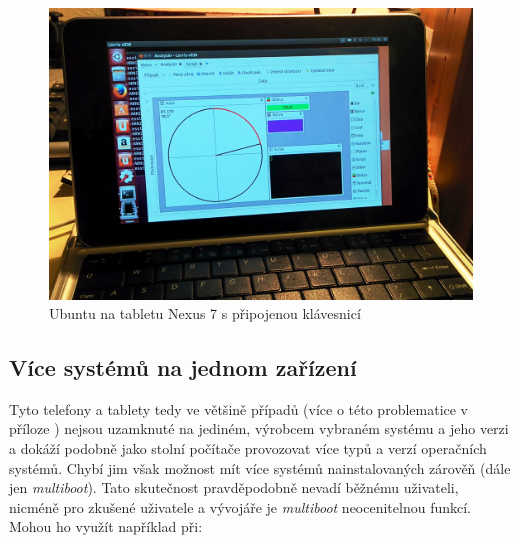 \documentclass[12pt, a4paper, oneside]{article}
\newcommand{\It}{\textit}  %
\begin{document}
\begin{figure}[H]
\begin{center}
\includegraphics[width=\textwidth]{img/n7_ubuntu.jpg}
\caption{Ubuntu na tabletu Nexus 7 s připojenou klávesnicí}
\end{center}
\end{figure}


\subsection{Více systémů na jednom zařízení}
Tyto telefony a tablety tedy ve většině případů (více o této problematice v příloze ) nejsou uzamknuté na jediném, výrobcem vybraném systému a jeho verzi a dokáží podobně jako stolní počítače provozovat více typů a verzí operačních systémů. Chybí jim však možnost mít více systémů nainstalovaných zárověň (dále jen \It{multiboot}). Tato skutečnost pravděpodobně nevadí běžnému uživateli, nicméně pro zkušené uživatele a vývojáře je \It{multiboot} neocenitelnou funkcí. Mohou ho využít například při:
\end{document}
